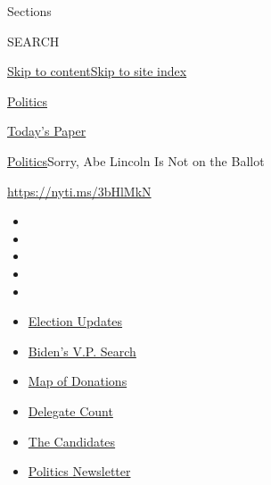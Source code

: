 Sections

SEARCH

\protect\hyperlink{site-content}{Skip to
content}\protect\hyperlink{site-index}{Skip to site index}

\href{https://www.nytimes.com/section/politics}{Politics}

\href{https://myaccount.nytimes.com/auth/login?response_type=cookie\&client_id=vi}{}

\href{https://www.nytimes.com/section/todayspaper}{Today's Paper}

\href{/section/politics}{Politics}\textbar{}Sorry, Abe Lincoln Is Not on
the Ballot

\url{https://nyti.ms/3bHlMkN}

\begin{itemize}
\item
\item
\item
\item
\item
\end{itemize}

\begin{itemize}
\item
  \href{https://www.nytimes.com/2020/07/31/us/elections/biden-vs-trump.html?action=click\&pgtype=Article\&state=default\&region=TOP_BANNER\&context=storylines_menu}{Election
  Updates}
\item
  \href{https://www.nytimes.com/article/biden-vice-president-2020.html?action=click\&pgtype=Article\&state=default\&region=TOP_BANNER\&context=storylines_menu}{Biden's
  V.P. Search}
\item
  \href{https://www.nytimes.com/interactive/2020/07/24/us/politics/trump-biden-campaign-donors.html?action=click\&pgtype=Article\&state=default\&region=TOP_BANNER\&context=storylines_menu}{Map
  of Donations}
\item
  \href{https://www.nytimes.com/interactive/2020/us/elections/delegate-count-primary-results.html?action=click\&pgtype=Article\&state=default\&region=TOP_BANNER\&context=storylines_menu}{Delegate
  Count}
\item
  \href{https://www.nytimes.com/interactive/2019/us/politics/2020-presidential-candidates.html?action=click\&pgtype=Article\&state=default\&region=TOP_BANNER\&context=storylines_menu}{The
  Candidates}
\item
  \href{https://www.nytimes.com/newsletters/politics?action=click\&pgtype=Article\&state=default\&region=TOP_BANNER\&context=storylines_menu}{Politics
  Newsletter}
\end{itemize}

